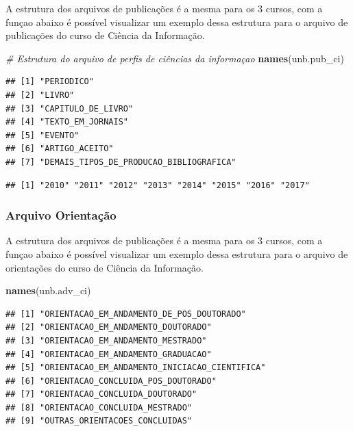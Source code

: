 \documentclass[]{article}
\newenvironment{Shaded}{\begin{snugshade}}{\end{snugshade}}
\newcommand{\KeywordTok}[1]{\textcolor[rgb]{0.13,0.29,0.53}{\textbf{#1}}}
\newcommand{\CommentTok}[1]{\textcolor[rgb]{0.56,0.35,0.01}{\textit{#1}}}
\newcommand{\OperatorTok}[1]{\textcolor[rgb]{0.81,0.36,0.00}{\textbf{#1}}}
\newcommand{\NormalTok}[1]{#1}
\begin{document}
A estrutura dos arquivos de publicações é a mesma para os 3 cursos, com
a funçao abaixo é possível visualizar um exemplo dessa estrutura para o
arquivo de publicações do curso de Ciência da Informação.

\begin{Shaded}
\begin{Highlighting}[]
\CommentTok{# Estrutura do arquivo de perfis de ciências da informaçao}
\KeywordTok{names}\NormalTok{(unb.pub_ci)}
\end{Highlighting}
\end{Shaded}

\begin{verbatim}
## [1] "PERIODICO"                             
## [2] "LIVRO"                                 
## [3] "CAPITULO_DE_LIVRO"                     
## [4] "TEXTO_EM_JORNAIS"                      
## [5] "EVENTO"                                
## [6] "ARTIGO_ACEITO"                         
## [7] "DEMAIS_TIPOS_DE_PRODUCAO_BIBLIOGRAFICA"
\end{verbatim}

\begin{Shaded}
\end{Shaded}

\begin{verbatim}
## [1] "2010" "2011" "2012" "2013" "2014" "2015" "2016" "2017"
\end{verbatim}

\subsubsection{Arquivo Orientação}\label{arquivo-orientacao}

A estrutura dos arquivos de publicações é a mesma para os 3 cursos, com
a funçao abaixo é possível visualizar um exemplo dessa estrutura para o
arquivo de orientações do curso de Ciência da Informação.

\begin{Shaded}
\begin{Highlighting}[]
\KeywordTok{names}\NormalTok{(unb.adv_ci)}
\end{Highlighting}
\end{Shaded}

\begin{verbatim}
## [1] "ORIENTACAO_EM_ANDAMENTO_DE_POS_DOUTORADO"    
## [2] "ORIENTACAO_EM_ANDAMENTO_DOUTORADO"           
## [3] "ORIENTACAO_EM_ANDAMENTO_MESTRADO"            
## [4] "ORIENTACAO_EM_ANDAMENTO_GRADUACAO"           
## [5] "ORIENTACAO_EM_ANDAMENTO_INICIACAO_CIENTIFICA"
## [6] "ORIENTACAO_CONCLUIDA_POS_DOUTORADO"          
## [7] "ORIENTACAO_CONCLUIDA_DOUTORADO"              
## [8] "ORIENTACAO_CONCLUIDA_MESTRADO"               
## [9] "OUTRAS_ORIENTACOES_CONCLUIDAS"
\end{verbatim}
\end{document}
